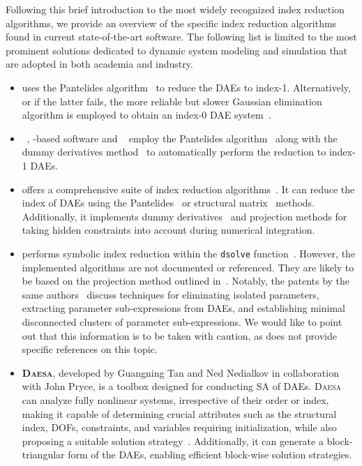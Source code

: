 Following this brief introduction to the most widely recognized index reduction algorithms, we provide an overview of the specific index reduction algorithms found in current state-of-the-art software. The following list is limited to the most prominent solutions dedicated to dynamic system modeling and simulation that are adopted in both academia and industry.
%
\begin{itemize}
  \setlength{\itemsep}{0.0em}
  \item \textbf{\Matlab{}} uses the Pantelides algorithm~\cite{pantelides1988consistent} to reduce the \acp{DAE} to index-1. Alternatively, or if the latter fails, the more reliable but slower Gaussian elimination algorithm is employed to obtain an index-0 \ac{DAE} system~\cite{matlab}.
  \item \textbf{\Modelica{}}~\cite{mattsson1997modelica, mattsson1998physical}, \Modelica{}-based software and \textbf{\ModelingToolkit{}}~\cite{modelingtoolkit} employ the Pantelides algorithm~\cite{pantelides1988consistent} along with the dummy derivatives method~\cite{mattsson1993index} to automatically perform the reduction to index-1 \acp{DAE}.
  \item \textbf{\Mathematica{}} offers a comprehensive suite of index reduction algorithms~\cite{mathematica}. It can reduce the index of \acp{DAE} using the Pantelides~\cite{pantelides1988consistent} or structural matrix~\cite{unger1995structural, chowdhry2004symbolic} methods. Additionally, it implements dummy derivatives~\cite{mattsson1993index} and projection methods for taking hidden constraints into account during numerical integration.
  \item \textbf{\Maple{}} performs symbolic index reduction within the \texttt{dsolve} function~\cite{maple}. However, the implemented algorithms are not documented or referenced. They are likely to be based on the projection method outlined in~\cite{shmoylova2013simplification}. Notably, the patents by the same authors~\cite{postma2012exact, shmoylova2012method, postma2015exact} discuss techniques for eliminating isolated parameters, extracting parameter sub-expressions from \acp{DAE}, and establishing minimal disconnected clusters of parameter sub-expressions. We would like to point out that this information is to be taken with caution, as \Maple{} does not provide specific references on this topic.
  \item \textbf{\textsc{Daesa}}, developed by Guangning Tan and Ned Nedialkov in collaboration with John Pryce, is a \Matlab{} toolbox designed for conducting \ac{SA} of \acp{DAE}. \textsc{Daesa} can analyze fully nonlinear systems, irrespective of their order or index, making it capable of determining crucial attributes such as the structural index, \acp{DOF}, constraints, and variables requiring initialization, while also proposing a suitable solution strategy~\cite{nedialkov2015algorithm, tan2016symbolic}. Additionally, it can generate a block-triangular form of the \acp{DAE}, enabling efficient block-wise solution strategies.

\end{itemize}

